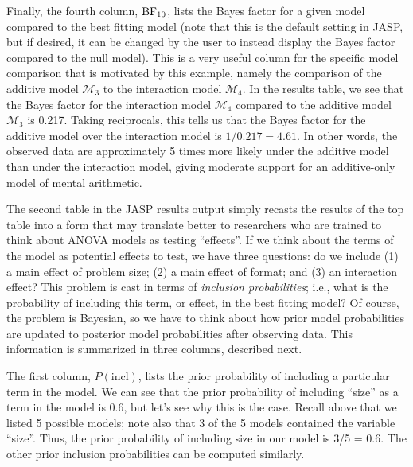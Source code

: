 \documentclass[english,,doc,floatsintext]{apa6}
\begin{document}
Finally, the fourth column, \(\textnormal{BF}_{10}\), lists the Bayes factor for a given model compared to the best fitting model (note that this is the default setting in JASP, but if desired, it can be changed by the user to instead display the Bayes factor compared to the null model). This is a very useful column for the specific model comparison that is motivated by this example, namely the comparison of the additive model \(\mathcal{M}_{3}\) to the interaction model \(\mathcal{M}_{4}\). In the results table, we see that the Bayes factor for the interaction model \(\mathcal{M}_{4}\) compared to the additive model \(\mathcal{M}_{3}\) is 0.217. Taking reciprocals, this tells us that the Bayes factor for the additive model over the interaction model is \(1/0.217 = 4.61\). In other words, the observed data are approximately 5 times more likely under the additive model than under the interaction model, giving moderate support for an additive-only model of mental arithmetic.

The second table in the JASP results output simply recasts the results of the top table into a form that may translate better to researchers who are trained to think about ANOVA models as testing \enquote{effects}. If we think about the terms of the model as potential effects to test, we have three questions: do we include (1) a main effect of problem size; (2) a main effect of format; and (3) an interaction effect? This problem is cast in terms of \emph{inclusion probabilities}; i.e., what is the probability of including this term, or effect, in the best fitting model? Of course, the problem is Bayesian, so we have to think about how prior model probabilities are updated to posterior model probabilities after observing data. This information is summarized in three columns, described next.

The first column, \(P(\text{incl})\), lists the prior probability of including a particular term in the model. We can see that the prior probability of including \enquote{size} as a term in the model is 0.6, but let's see why this is the case. Recall above that we listed 5 possible models; note also that 3 of the 5 models contained the variable \enquote{size}. Thus, the prior probability of including size in our model is 3/5 = 0.6. The other prior inclusion probabilities can be computed similarly.
\end{document}
